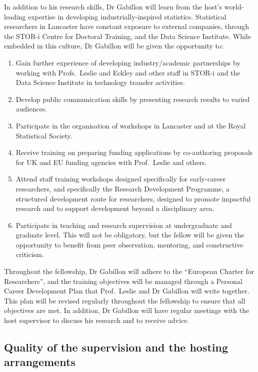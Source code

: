 \documentclass[a4paper,11pt]{article}
\begin{document}
In addition to his research skills, Dr Gabillon will learn from the host's world-leading expertise in developing industrially-inspired statistics.  Statistical researchers in Lancaster have constant exposure to external companies, through the STOR-i Centre for Doctoral Training, and the Data Science Institute.  While embedded in this culture, Dr Gabillon will be given the opportunity to:
\begin{enumerate}
\item Gain further experience of developing industry/academic partnerships by working with Profs.\ Leslie and Eckley and other staff in STOR-i and the Data Science Institute in technology transfer activities.
\item Develop public communication skills by presenting research results to varied audiences.
\item Participate in the organisation of workshops in Lancaster and at the Royal Statistical Society.
\item Receive training on preparing funding applications by co-authoring proposals for UK and EU funding agencies with Prof.\ Leslie and others.
\item Attend staff training workshops designed specifically for early-career researchers, and specifically the Research Development Programme, a structured development route for researchers, designed to promote impactful research and to support development beyond a disciplinary area.
\item Participate in teaching and research supervision at undergraduate and graduate level.  This will not be obligatory, but the fellow will be given the opportunity to benefit from peer observation, mentoring, and constructive criticism.
\end{enumerate}

Throughout the fellowship, Dr Gabillon will adhere to the ``European Charter for Researchers'', and the training objectives will be managed through a Personal Career Development Plan that Prof.\ Leslie and Dr Gabillon will write together.  This plan will be revised regularly throughout the fellowship to ensure that all objectives are met.  In addition, Dr Gabillon will have regular meetings with the host supervisor to discuss his research and to receive advice.


\subsection{Quality of the supervision and the hosting arrangements}
\label{sec:supervision}
\end{document}
